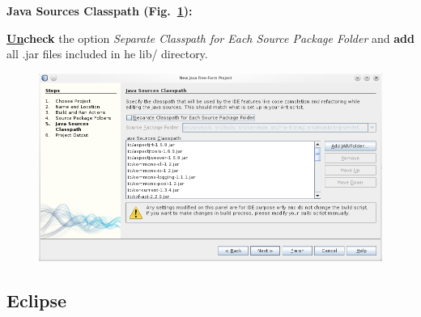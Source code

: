 \begin{compactenum}
\begin{compactenum}
\item \textbf{Java Sources Classpath (Fig.~\ref{fig:nb:sourcesclasspath}):} %

\textbf{\underline{Un}check} the option \textit{Separate Classpath for Each Source Package Folder} and %
\textbf{add} all .jar files included in he lib/ directory.

\begin{figure}[H]\centering
\includegraphics[scale=0.5]{figures/netbeans-SourcesClasspath}
\caption{}
\label{fig:nb:sourcesclasspath}
\end{figure}

\end{compactenum}
\end{compactenum}



\subsection{Eclipse}